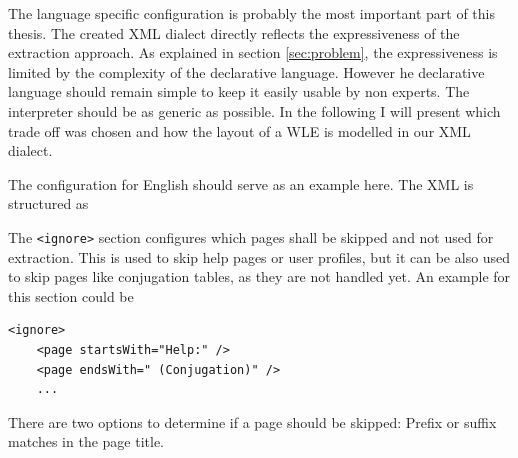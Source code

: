 The language specific configuration is probably the most important part of this thesis. 
The created XML dialect directly reflects the expressiveness of the extraction approach. 
As explained in section \ref{sec:problem}, the expressiveness is limited by the complexity of the declarative language. 
However he declarative language should remain simple to keep it easily usable by non experts. 
The interpreter should be as generic as possible. 
In the following I will present which trade off was chosen and how the layout of a WLE is modelled in our XML dialect.

The configuration for English should serve as an example here. 
The XML is structured as

The \texttt{<ignore>} section configures which pages shall be skipped and not used for extraction. 
This is used to skip help pages or user profiles, but it can be also used to skip pages like conjugation tables, as they are not handled yet. 
An example for this section could be
\begin{lstlisting}[style=XML]
<ignore>
	<page startsWith="Help:" />
	<page endsWith=" (Conjugation)" />
	...
\end{lstlisting}
There are two options to determine if a page should be skipped: Prefix or suffix matches in the page title.

